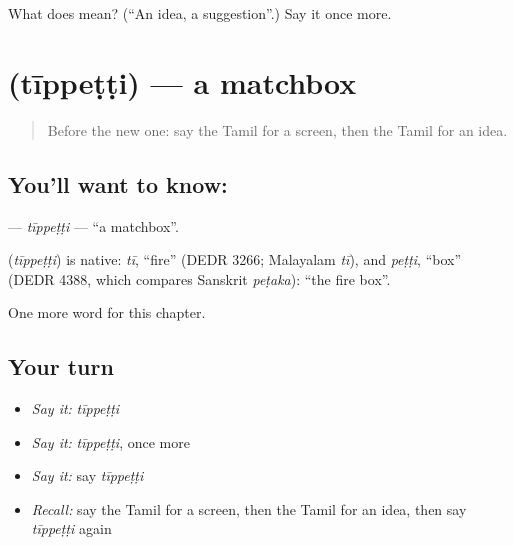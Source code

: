 \begin{tcolorbox}[breakable,colback=teal!4,colframe=teal!35!black,title={Before you move on}]
What does  mean? (\textquotedblleft{}An idea, a suggestion\textquotedblright{}.) Say it once more.
\end{tcolorbox}
\section[\texorpdfstring{\ta{தீப்பெட்டி} (tīppeṭṭi)}{தீப்பெட்டி (tīppeṭṭi)}]{ (tīppeṭṭi) — a matchbox}

\label{lesson:TA-C190-tippetti}



\begin{quote}
Before the new one: say the Tamil for a screen, then the Tamil for an idea.
\end{quote}

\subsection*{You'll want to know: }
\textbf{} — \emph{tīppeṭṭi} — \textquotedblleft{}a matchbox\textquotedblright{}.

\begin{cousinweb}
\textbf{} (\emph{tīppeṭṭi}) is native: \emph{tī}, \textquotedblleft{}fire\textquotedblright{} (DEDR 3266; Malayalam \emph{tī}), and \emph{peṭṭi}, \textquotedblleft{}box\textquotedblright{} (DEDR 4388, which compares Sanskrit \emph{peṭaka}): \textquotedblleft{}the fire box\textquotedblright{}.
\end{cousinweb}

\begin{grammarlens}[title={What you've built}]
One more word for this chapter.
\end{grammarlens}

\subsection*{Your turn}
\begin{itemize}
\raggedright
  \item \emph{Say it:} \emph{tīppeṭṭi}
  \item \emph{Say it:} \emph{tīppeṭṭi}, once more
  \item \emph{Say it:} say \emph{tīppeṭṭi}
  \item \emph{Recall:} say the Tamil for a screen, then the Tamil for an idea, then say \emph{tīppeṭṭi} again
\end{itemize}

